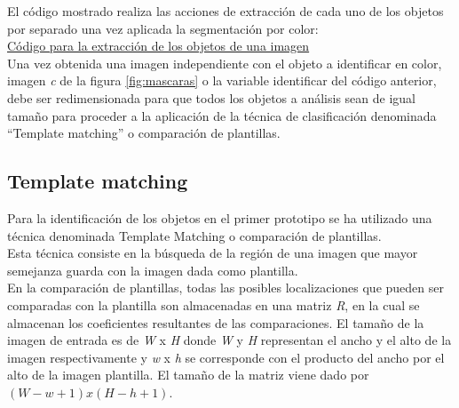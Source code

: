 El código mostrado realiza las acciones de extracción de cada uno de los objetos por separado una vez aplicada la segmentación por color:\\

\underline{Código para la extracción de los objetos de una imagen}\\


Una vez obtenida una imagen independiente con el objeto a identificar en color, imagen \emph{c} de la figura \ref{fig:mascaras} o la variable identificar del código anterior, debe ser redimensionada para que todos los objetos a análisis sean de igual tamaño para proceder a la aplicación de la técnica de clasificación denominada ``Template matching'' o comparación de plantillas.

\subsection {Template matching}

Para la identificación de los objetos en el primer prototipo se ha utilizado una técnica denominada Template Matching o comparación de plantillas.\\

Esta técnica consiste en la búsqueda de la región de una imagen que mayor semejanza guarda con la imagen dada como plantilla.\\

En la comparación de plantillas, todas las posibles localizaciones que pueden ser comparadas con la plantilla son almacenadas en una matriz \emph{R}, en la cual se almacenan los coeficientes resultantes de las comparaciones. El tamaño de la imagen de entrada es de \emph{W} x \emph{H} donde \emph{W} y \emph{H} representan el ancho y el alto de la imagen respectivamente y \emph{w} x \emph{h} se corresponde con el producto del ancho por el alto de la imagen plantilla. El tamaño de la matriz viene dado por $(W - w + 1) x (H - h + 1)$. \\

